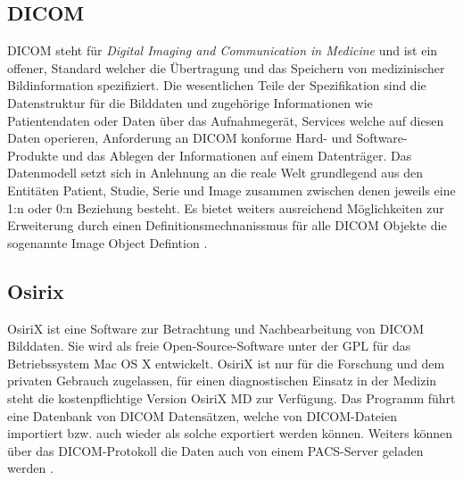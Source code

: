 \subsection{DICOM}
\label{sec:DICOM}
DICOM steht für \emph{Digital Imaging and Communication in Medicine} und ist ein offener,
Standard welcher die Übertragung und das Speichern von medizinischer Bildinformation spezifiziert.
Die wesentlichen Teile der Spezifikation sind die Datenstruktur für die Bilddaten und zugehörige Informationen wie Patientendaten oder Daten über das Aufnahmegerät, 
Services welche auf diesen Daten operieren, Anforderung an DICOM konforme Hard- und Software-Produkte und das Ablegen der Informationen auf einem Datenträger.
Das Datenmodell setzt sich in Anlehnung an die reale Welt grundlegend aus den Entitäten Patient, Studie, Serie und Image zusammen zwischen denen jeweils eine 1:n oder 0:n Beziehung besteht.
Es bietet weiters ausreichend Möglichkeiten zur Erweiterung durch einen Definitionsmechnanissmus für alle DICOM Objekte die sogenannte Image Object Defintion \cite{pacs}.

\subsection{Osirix}
\label{sec:Osirix}
OsiriX ist eine Software zur Betrachtung und Nachbearbeitung von DICOM Bilddaten.
Sie wird als freie Open-Source-Software unter der GPL für das Betriebssystem Mac OS X entwickelt.
OsiriX ist nur für die Forschung und dem privaten Gebrauch zugelassen, 
für einen diagnostischen Einsatz in der Medizin steht die kostenpflichtige Version OsiriX MD zur Verfügung.
%
Das Programm führt eine Datenbank von DICOM Datensätzen, 
welche von DICOM-Dateien importiert bzw. auch wieder als solche exportiert werden können.
Weiters können über das DICOM-Protokoll die Daten auch von einem PACS-Server geladen werden \cite{osirix}.

